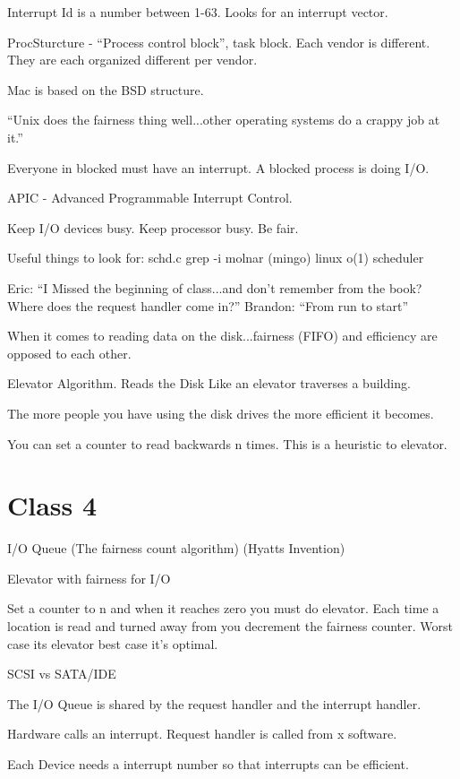 \documentclass{article}
\begin{document}
Interrupt Id is a number between 1-63. Looks for an interrupt vector. 

ProcSturcture - ``Process control block'', task block. Each vendor is different. They are each organized different per vendor. 

Mac is based on the BSD structure. 

``Unix does the fairness thing well...other operating systems do a crappy job at it.''

Everyone in blocked must have an interrupt. 
A blocked process is doing I/O.

APIC - Advanced Programmable Interrupt Control.

Keep I/O devices busy. 
Keep processor busy. 
Be fair.


Useful things to look for:
schd.c
grep -i molnar (mingo)
linux o(1) scheduler

Eric: ``I Missed the beginning of class...and don't remember from the book? Where does the request handler come in?''
Brandon: ``From run to start''

When it comes to reading data on the disk...fairness (FIFO) and efficiency are opposed to each other. 

Elevator Algorithm. Reads the Disk Like an elevator traverses a building. 

The more people you have using the disk drives the more efficient it becomes. 

You can set a counter to read backwards n times. This is a heuristic to elevator. 

\section*{Class 4}

I/O Queue (The fairness count algorithm) (Hyatts Invention)

Elevator with fairness for I/O

Set a counter to n and when it reaches zero you must do elevator. 
Each time a location is read and turned away from you decrement the fairness counter. 
Worst case its elevator best case it's optimal. 

SCSI vs SATA/IDE

The I/O Queue is shared by the request handler and the interrupt handler. 

Hardware calls an interrupt.
Request handler is called from x software. 

Each Device needs a interrupt number so that interrupts can be efficient.
\end{document}
